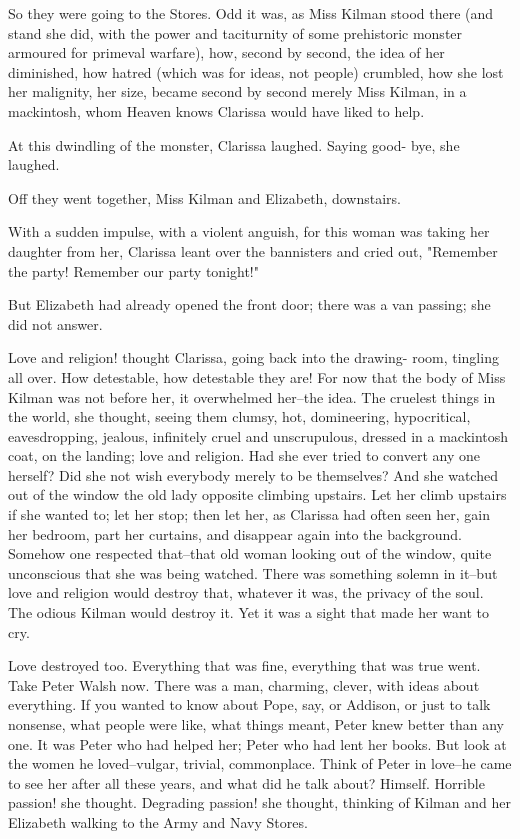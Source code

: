\documentclass[lang=cn,10pt]{elegantbook}
\begin{document}
So they were going to the Stores.  Odd it was, as Miss Kilman stood
there (and stand she did, with the power and taciturnity of some
prehistoric monster armoured for primeval warfare), how, second by
second, the idea of her diminished, how hatred (which was for
ideas, not people) crumbled, how she lost her malignity, her size,
became second by second merely Miss Kilman, in a mackintosh, whom
Heaven knows Clarissa would have liked to help.

At this dwindling of the monster, Clarissa laughed.  Saying good-
bye, she laughed.

Off they went together, Miss Kilman and Elizabeth, downstairs.

With a sudden impulse, with a violent anguish, for this woman was
taking her daughter from her, Clarissa leant over the bannisters
and cried out, "Remember the party!  Remember our party tonight!"

But Elizabeth had already opened the front door; there was a van
passing; she did not answer.

Love and religion! thought Clarissa, going back into the drawing-
room, tingling all over.  How detestable, how detestable they are!
For now that the body of Miss Kilman was not before her, it
overwhelmed her--the idea.  The cruelest things in the world, she
thought, seeing them clumsy, hot, domineering, hypocritical,
eavesdropping, jealous, infinitely cruel and unscrupulous, dressed
in a mackintosh coat, on the landing; love and religion.  Had she
ever tried to convert any one herself?  Did she not wish everybody
merely to be themselves?  And she watched out of the window the old
lady opposite climbing upstairs.  Let her climb upstairs if she
wanted to; let her stop; then let her, as Clarissa had often seen
her, gain her bedroom, part her curtains, and disappear again into
the background.  Somehow one respected that--that old woman looking
out of the window, quite unconscious that she was being watched.
There was something solemn in it--but love and religion would
destroy that, whatever it was, the privacy of the soul.  The odious
Kilman would destroy it.  Yet it was a sight that made her want to
cry.

Love destroyed too.  Everything that was fine, everything that was
true went.  Take Peter Walsh now.  There was a man, charming,
clever, with ideas about everything.  If you wanted to know about
Pope, say, or Addison, or just to talk nonsense, what people were
like, what things meant, Peter knew better than any one.  It was
Peter who had helped her; Peter who had lent her books.  But look
at the women he loved--vulgar, trivial, commonplace.  Think of
Peter in love--he came to see her after all these years, and what
did he talk about?  Himself.  Horrible passion! she thought.
Degrading passion! she thought, thinking of Kilman and her
Elizabeth walking to the Army and Navy Stores.
\end{document}
